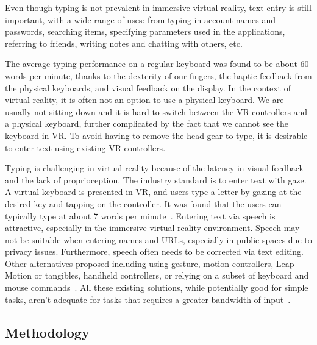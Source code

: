 Even though typing is not prevalent in immersive virtual reality, text entry is still important, with a wide range of uses: from typing in account names and passwords, searching items, specifying parameters used in the applications, referring to friends,  writing notes and chatting with others, etc.      

The average typing performance on a regular keyboard was found to be about 60 words per minute\cite{varcholik:textentry}, thanks to the dexterity of our fingers, the haptic feedback from the physical keyboards, and visual feedback on the display.    In the context of virtual reality, it is often not an option to use a physical keyboard.  We are usually not sitting down and it is hard to switch between the VR controllers and a physical keyboard, further complicated by the fact that we cannot see the keyboard in VR.  To avoid having to remove the head gear to type, it is desirable to enter text using existing VR controllers. 

Typing is challenging in virtual reality because of the latency in visual feedback and the lack of proprioception.  The industry standard is to enter text with gaze.  A virtual keyboard is presented in VR, and users type a letter by gazing at the desired key and tapping on the controller.   It was found that the users can typically type at about 7 words per minute~\cite{majaranta2006effects}.   Entering text via speech is attractive, especially in the immersive virtual reality environment.  Speech may not be suitable when entering names and URLs, especially in public spaces due to privacy issues.  Furthermore, speech often needs to be corrected via text editing.  Other alternatives proposed including using gesture, motion controllers, Leap Motion or tangibles, handheld controllers, or relying on a subset of keyboard and mouse commands~\cite{billinghurst1999collaborative}.
All these existing solutions, while potentially good for simple tasks, aren't adequate for tasks that requires a greater bandwidth of input~\cite{McGill:2015:DRO:2702123.2702382}.


\subsection{Methodology}

